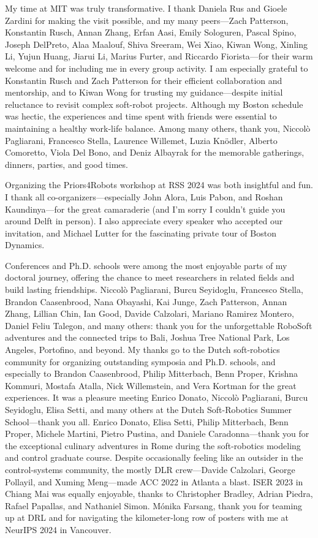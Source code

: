 My time at MIT was truly transformative. I thank Daniela Rus and Gioele Zardini for making the visit possible, and my many peers—Zach Patterson, Konstantin Rusch, Annan Zhang, Erfan Aasi, Emily Sologuren, Pascal Spino, Joseph DelPreto, Alaa Maalouf, Shiva Sreeram, Wei Xiao, Kiwan Wong, Xinling Li, Yujun Huang, Jiarui Li, Marius Furter, and Riccardo Fiorista—for their warm welcome and for including me in every group activity. I am especially grateful to Konstantin Rusch and Zach Patterson for their efficient collaboration and mentorship, and to Kiwan Wong for trusting my guidance—despite initial reluctance to revisit complex soft-robot projects.
Although my Boston schedule was hectic, the experiences and time spent with friends were essential to maintaining a healthy work-life balance. Among many others, thank you, Niccolò Pagliarani, Francesco Stella, Laurence Willemet, Luzia Knödler, Alberto Comoretto, Viola Del Bono, and Deniz Albayrak for the memorable gatherings, dinners, parties, and good times.

Organizing the Priors4Robots workshop at RSS 2024 was both insightful and fun. I thank all co-organizers—especially John Alora, Luis Pabon, and Roshan Kaundinya—for the great camaraderie (and I’m sorry I couldn’t guide you around Delft in person). I also appreciate every speaker who accepted our invitation, and Michael Lutter for the fascinating private tour of Boston Dynamics.

Conferences and Ph.D. schools were among the most enjoyable parts of my doctoral journey, offering the chance to meet researchers in related fields and build lasting friendships. Niccolò Pagliarani, Burcu Seyidoglu, Francesco Stella, Brandon Caasenbrood, Nana Obayashi, Kai Junge, Zach Patterson, Annan Zhang, Lillian Chin, Ian Good, Davide Calzolari, Mariano Ramirez Montero, Daniel Feliu Talegon, and many others: thank you for the unforgettable RoboSoft adventures and the connected trips to Bali, Joshua Tree National Park, Los Angeles, Portofino, and beyond.
My thanks go to the Dutch soft-robotics community for organizing outstanding symposia and Ph.D. schools, and especially to Brandon Caasenbrood, Philip Mitterbach, Benn Proper, Krishna Kommuri, Mostafa Atalla, Nick Willemstein, and Vera Kortman for the great experiences. It was a pleasure meeting Enrico Donato, Niccolò Pagliarani, Burcu Seyidoglu, Elisa Setti, and many others at the Dutch Soft-Robotics Summer School—thank you all.
Enrico Donato, Elisa Setti, Philip Mitterbach, Benn Proper, Michele Martini, Pietro Pustina, and Daniele Caradonna—thank you for the exceptional culinary adventures in Rome during the soft-robotics modeling and control graduate course.
Despite occasionally feeling like an outsider in the control-systems community, the mostly DLR crew—Davide Calzolari, George Pollayil, and Xuming Meng—made ACC 2022 in Atlanta a blast. ISER 2023 in Chiang Mai was equally enjoyable, thanks to Christopher Bradley, Adrian Piedra, Rafael Papallas, and Nathaniel Simon. 
Mónika Farsang, thank you for teaming up at DRL and for navigating the kilometer-long row of posters with me at NeurIPS 2024 in Vancouver.

